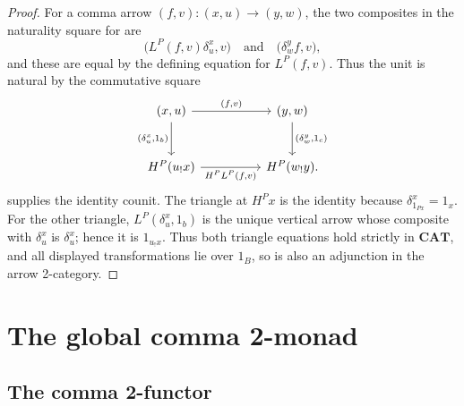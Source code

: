 \documentclass[11pt]{article}
\theoremstyle{plain}
\theoremstyle{definition}
\theoremstyle{remark}
\newcommand{\CAT}{\mathbf{CAT}}
\numberwithin{equation}{section}
\begin{document}
\begin{proof}
For a comma arrow $(f,v)\colon(x,u)\to(y,w)$, the two composites in the
naturality square for  are
\begin{equation*}
  \bigl(L^{P}(f,v)\delta^{x}_{u},v\bigr)
  \quad\text{and}\quad
  \bigl(\delta^{y}_{w}f,v\bigr),
\end{equation*}
and these are equal by the defining equation for $L^{P}(f,v)$.
Thus the unit is natural by the commutative square
\begin{equation*}
\begin{tikzcd}[column sep=huge,row sep=large]
(x,u) \arrow[r,"{(f,v)}"]
  \arrow[d,"{(\delta^x_u,1_b)}"']
  & (y,w) \arrow[d,"{(\delta^y_w,1_c)}"] \\
H^P(u_!x) \arrow[r,"{H^P L^P(f,v)}"']
  & H^P(w_!y).
\end{tikzcd}
\end{equation*}
 supplies the identity counit.  The triangle at
$H^{P}x$ is the identity because $\delta^{x}_{1_{Px}}=1_x$.  For the
other triangle, $L^{P}(\delta^{x}_{u},1_b)$ is the unique vertical
arrow whose composite with $\delta^{x}_{u}$ is $\delta^{x}_{u}$; hence
it is $1_{u_{!}x}$.  Thus both triangle equations hold strictly in
$\CAT$, and all displayed transformations lie over $1_B$, so
 is also an adjunction in the arrow
2-category.
\end{proof}

\section{The global comma 2-monad}
\label{sec:monad}

\subsection{The comma 2-functor}
\end{document}
